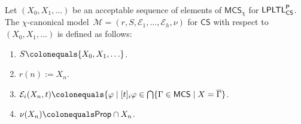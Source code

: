 \documentclass[envcountsect,envcountsame,oribibl,orivec]{llncs}
\newcommand{\Prop}{\textsf{Prop}}
\newcommand{\LPLTLp}{\textsf{LPLTL}^{\sf P}}
\newcommand{\jbox}[1]{\left[#1\right]\!}
\newcommand{\CS}{\textsf{CS}}
\newcommand{\numberofagents}{h}
\newcommand{\agent}{i}
\newcommand{\evidence}{\mathcal{E}}
\newcommand{\valuation}{\nu}
\newcommand{\M}{\mathcal{M}}
\newcommand{\N}{\mathbb{N}}
\renewcommand{\phi}{\varphi}
\newcommand{\MCS}{\mathsf{MCS}}
\begin{document}
\begin{definition}\label{def:canonical M-model} 
	Let  $(X_0, X_1, \ldots)$ be an acceptable sequence of elements of $\MCS_\chi$ for $\LPLTLp_\CS$. The $\chi$-canonical  model~$\M = (r,S,\evidence_1,\ldots,\evidence_\numberofagents, \valuation)$ for $\CS$
	with respect to $(X_0, X_1, \ldots)$
	is  defined as follows:
	\begin{enumerate}
		
		\item $S \colonequals \{X_0, X_1, \ldots\}$.
		\item $r(n) := X_n$.
		\item $\evidence_\agent(X_n,t) \colonequals \{ \phi \mid \jbox{t}_\agent \phi \in \bigcap \{ \Gamma \in \MCS \mid X = \overline{\Gamma} \}$.
		\item $\valuation(X_n) \colonequals \Prop\cap X_n$.
		
	\end{enumerate}
	
\end{definition}

%		
%		
%		
%
%	
\end{document}
